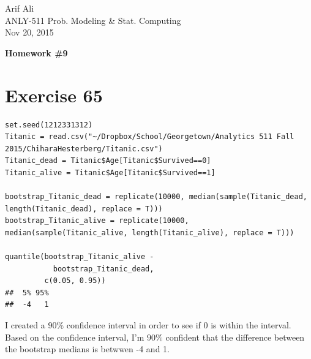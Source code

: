 \documentclass{article}\usepackage[]{graphicx}\usepackage[]{color}
\makeatletter
\newenvironment{kframe}{%
 \def\at@end@of@kframe{}%
 \ifinner\ifhmode%
  \def\at@end@of@kframe{\end{minipage}}%
  \begin{minipage}{\columnwidth}%
 \fi\fi%
 \def\FrameCommand##1{\hskip\@totalleftmargin \hskip-\fboxsep
 \colorbox{shadecolor}{##1}\hskip-\fboxsep
     \hskip-\linewidth \hskip-\@totalleftmargin \hskip\columnwidth}%
 \MakeFramed {\advance\hsize-\width
   \@totalleftmargin\z@ \linewidth\hsize
   \@setminipage}}%
 {\par\unskip\endMakeFramed%
 \at@end@of@kframe}
\newenvironment{knitrout}{}{} %
\makeatother
\begin{document}
\begin{flushright}
  Arif Ali\\
  ANLY-511 Prob. Modeling \& Stat. Computing\\
	Nov 20, 2015\\
\end{flushright}

\begin{center}
  \LARGE\textbf{Homework \#9}
\end{center}
\section*{Exercise 65}
\begin{knitrout}
\color{fgcolor}\begin{kframe}
\begin{verbatim}
set.seed(1212331312)
Titanic = read.csv("~/Dropbox/School/Georgetown/Analytics 511 Fall 2015/ChiharaHesterberg/Titanic.csv")
Titanic_dead = Titanic$Age[Titanic$Survived==0]
Titanic_alive = Titanic$Age[Titanic$Survived==1]

bootstrap_Titanic_dead = replicate(10000, median(sample(Titanic_dead, length(Titanic_dead), replace = T)))
bootstrap_Titanic_alive = replicate(10000, median(sample(Titanic_alive, length(Titanic_alive), replace = T)))

quantile(bootstrap_Titanic_alive - 
           bootstrap_Titanic_dead, 
         c(0.05, 0.95))
##  5% 95% 
##  -4   1
\end{verbatim}
\end{kframe}
\end{knitrout}
I created a $90\%$ confidence interval in order to see if 0 is within the interval. Based on the confidence interval, I'm $90\%$ confident that the difference between the bootstrap medians is betwwen -4 and 1.
\end{document}

